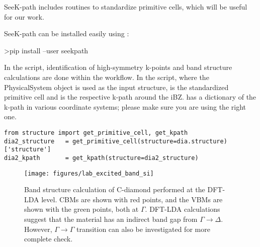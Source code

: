 SeeK-path includes routines to standardize primitive cells, which will be useful for our work.

SeeK-path can be installed easily using :
\begin{shade}
>pip install --user seekpath
\end{shade}
 
In the  script, identification of high-symmetry k-points and band structure calculations are done within the workflow. 
In the script, where the  PhysicalSystem object is used as the input structure,  is the standardized primitive cell and  is the respective k-path around the iBZ. 
 has a dictionary of the k-path in various coordinate systems; please make sure you are using the right one. 

\begin{lstlisting}[style=Python]
from structure import get_primitive_cell, get_kpath
dia2_structure   = get_primitive_cell(structure=dia.structure)['structure']
dia2_kpath       = get_kpath(structure=dia2_structure)
\end{lstlisting}

\begin{figure}
	\centering
	\texttt{[image: figures/lab\_excited\_band\_si]}
	\caption{Band structure calculation of C-diamond performed at the DFT-LDA level. CBMs are shown with red points, and the VBMs  are shown with the green points, both at $\Gamma$.  DFT-LDA calculations suggest that the material has an indirect band gap from $\Gamma\rightarrow{\Delta}$. However, $\Gamma\rightarrow{\Gamma}$ transition can also be investigated for more complete check. }
	\label{fig:lab_ex_bands}
\end{figure}

